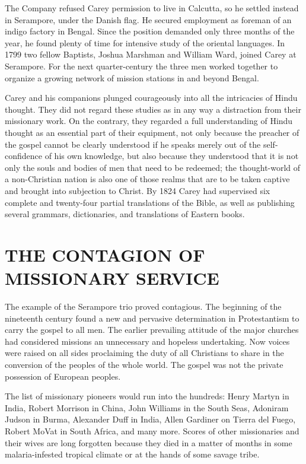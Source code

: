 The Company refused Carey permission to live in Calcutta, so he settled instead in Serampore, under
the Danish flag. He secured employment as foreman of an indigo factory in Bengal. Since the position
demanded only three months of the year, he found plenty of time for intensive study of the oriental
languages. In 1799 two fellow Baptists, Joshua Marshman and William Ward, joined Carey at Serampore.
For the next quarter-century the three men worked together to organize a growing network of mission
stations in and beyond Bengal.

Carey and his companions plunged courageously into all the intricacies of Hindu thought. They did
not regard these studies as in any way a distraction from their missionary work. On the contrary,
they regarded a full understanding of Hindu thought as an essential part of their equipment, not
only because the preacher of the gospel cannot be clearly understood if he speaks merely out of the
self-confidence of his own knowledge, but also because they understood that it is not only the souls
and bodies of men that need to be redeemed; the thought-world of a non-Christian nation is also one
of those realms that are to be taken captive and brought into subjection to Christ. By 1824 Carey
had supervised six complete and twenty-four partial translations of the Bible, as well as publishing
several grammars, dictionaries, and translations of Eastern books.

\section{THE CONTAGION OF MISSIONARY SERVICE}

The example of the Serampore trio proved contagious. The beginning of the nineteenth century found a
new and pervasive determination in Protestantism to carry the gospel to all men. The earlier
prevailing attitude of the major churches had considered missions an unnecessary and hopeless
undertaking. Now voices were raised on all sides proclaiming the duty of all Christians to share in
the conversion of the peoples of the whole world. The gospel was not the private possession of
European peoples.

The list of missionary pioneers would run into the hundreds: Henry Martyn in India, Robert Morrison
in China, John Williams in the South Seas, Adoniram Judson in Burma, Alexander Duff in India, Allen
Gardiner on Tierra del Fuego, Robert MoVat in South Africa, and many more. Scores of other
missionaries and their wives are long forgotten because they died in a matter of months in some
malaria-infested tropical climate or at the hands of some savage tribe.

